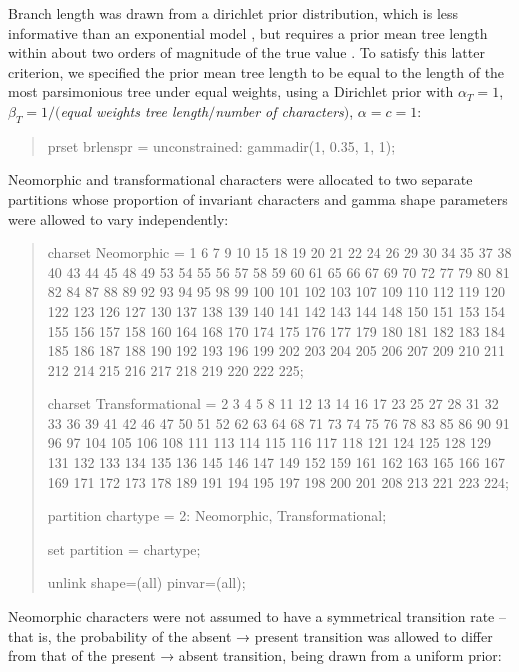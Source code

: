 \documentclass[openany]{book}
\begin{document}
Branch length was drawn from a dirichlet prior distribution, which is
less informative than an exponential model \citep{Rannala2012}, but
requires a prior mean tree length within about two orders of magnitude
of the true value \citep{Zhang2012}. To satisfy this latter criterion,
we specified the prior mean tree length to be equal to the length of the
most parsimonious tree under equal weights, using a Dirichlet prior with
\(\alpha_T = 1\), \(\beta_T = 1/(\)\emph{equal weights tree
length}\(/\)\emph{number of characters}\()\), \(\alpha = c = 1\):

\begin{quote}
prset brlenspr = unconstrained: gammadir(1, 0.35, 1, 1);
\end{quote}

Neomorphic and transformational characters
\citep[\emph{sensu}][]{Sereno2007} were allocated to two separate
partitions whose proportion of invariant characters and gamma shape
parameters were allowed to vary independently:

\begin{quote}
charset Neomorphic = 1 6 7 9 10 15 18 19 20 21 22 24 26 29 30 34 35 37
38 40 43 44 45 48 49 53 54 55 56 57 58 59 60 61 65 66 67 69 70 72 77 79
80 81 82 84 87 88 89 92 93 94 95 98 99 100 101 102 103 107 109 110 112
119 120 122 123 126 127 130 137 138 139 140 141 142 143 144 148 150 151
153 154 155 156 157 158 160 164 168 170 174 175 176 177 179 180 181 182
183 184 185 186 187 188 190 192 193 196 199 202 203 204 205 206 207 209
210 211 212 214 215 216 217 218 219 220 222 225;

charset Transformational = 2 3 4 5 8 11 12 13 14 16 17 23 25 27 28 31 32
33 36 39 41 42 46 47 50 51 52 62 63 64 68 71 73 74 75 76 78 83 85 86 90
91 96 97 104 105 106 108 111 113 114 115 116 117 118 121 124 125 128 129
131 132 133 134 135 136 145 146 147 149 152 159 161 162 163 165 166 167
169 171 172 173 178 189 191 194 195 197 198 200 201 208 213 221 223 224;

partition chartype = 2: Neomorphic, Transformational;

set partition = chartype;

unlink shape=(all) pinvar=(all);
\end{quote}

Neomorphic characters were not assumed to have a symmetrical transition
rate -- that is, the probability of the absent → present transition was
allowed to differ from that of the present → absent transition, being
drawn from a uniform prior:
\end{document}
